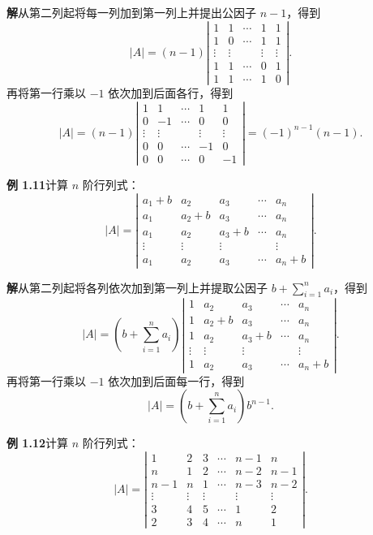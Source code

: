 \documentclass[UTF8,12pt,a4paper,fontset=fandol]{ctexart}
\begin{document}
\noindent\textbf{解}\quad 从第二列起将每一列加到第一列上并提出公因子 $n-1$，得到
\[
|A|=(n-1)
\left|\begin{array}{ccccc}
1 & 1 & \cdots & 1 & 1\\
1 & 0 & \cdots & 1 & 1\\
\vdots & \vdots &        & \vdots & \vdots\\
1 & 1 & \cdots & 0 & 1\\
1 & 1 & \cdots & 1 & 0
\end{array}\right|.
\]
再将第一行乘以 $-1$ 依次加到后面各行，得到
\[
|A|=(n-1)
\left|\begin{array}{ccccc}
1 & 1 & \cdots & 1 & 1\\
0 & -1 & \cdots & 0 & 0\\
\vdots & \vdots &        & \vdots & \vdots\\
0 & 0 & \cdots & -1 & 0\\
0 & 0 & \cdots & 0 & -1
\end{array}\right|
=(-1)^{n-1}(n-1).
\]

\noindent\textbf{例 1.11}\quad 计算 $n$ 阶行列式：
\[
|A|=\left|\begin{array}{ccccc}
a_1+b & a_2 & a_3 & \cdots & a_n\\
a_1 & a_2+b & a_3 & \cdots & a_n\\
a_1 & a_2 & a_3+b & \cdots & a_n\\
\vdots & \vdots & \vdots &        & \vdots\\
a_1 & a_2 & a_3 & \cdots & a_n+b
\end{array}\right|.
\]

\noindent\textbf{解}\quad 从第二列起将各列依次加到第一列上并提取公因子 $b+\sum_{i=1}^n a_i$，得到
\[
|A|=\left(b+\sum_{i=1}^n a_i\right)
\left|\begin{array}{ccccc}
1 & a_2 & a_3 & \cdots & a_n\\
1 & a_2+b & a_3 & \cdots & a_n\\
1 & a_2 & a_3+b & \cdots & a_n\\
\vdots & \vdots & \vdots &        & \vdots\\
1 & a_2 & a_3 & \cdots & a_n+b
\end{array}\right|.
\]
再将第一行乘以 $-1$ 依次加到后面每一行，得到
\[
|A|=\left(b+\sum_{i=1}^n a_i\right)b^{n-1}.
\]

\noindent\textbf{例 1.12}\quad 计算 $n$ 阶行列式：
\[
|A|=\left|\begin{array}{cccccc}
1 & 2 & 3 & \cdots & n-1 & n\\
n & 1 & 2 & \cdots & n-2 & n-1\\
n-1 & n & 1 & \cdots & n-3 & n-2\\
\vdots & \vdots & \vdots &        & \vdots & \vdots\\
3 & 4 & 5 & \cdots & 1 & 2\\
2 & 3 & 4 & \cdots & n & 1
\end{array}\right|.
\]
\end{document}
